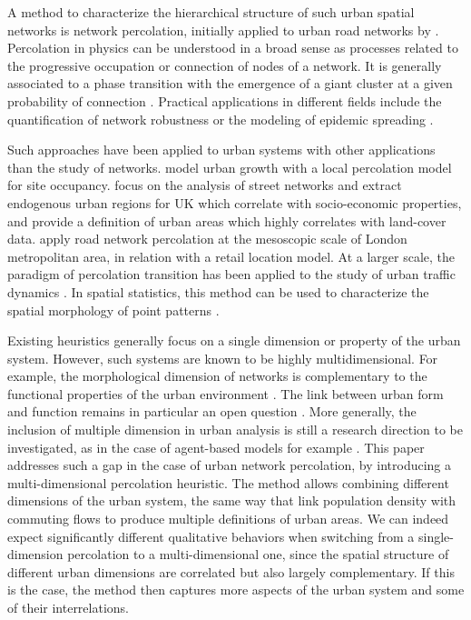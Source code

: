 \documentclass{jimis-en}
\begin{document}
A method to characterize the hierarchical structure of such urban spatial networks is network percolation, initially applied to urban road networks by \cite{arcaute2016cities}. Percolation in physics can be understood in a broad sense as processes related to the progressive occupation or connection of nodes of a network. It is generally associated to a phase transition with the emergence of a giant cluster at a given probability of connection \citep{stauffer2014introduction}. Practical applications in different fields include the quantification of network robustness \citep{callaway2000network} or the modeling of epidemic spreading \citep{newman1999scaling}.

Such approaches have been applied to urban systems with other applications than the study of networks. \cite{makse1998modeling} model urban growth with a local percolation model for site occupancy. \cite{arcaute2016cities} focus on the analysis of street networks and extract endogenous urban regions for UK which correlate with socio-economic properties, and provide a definition of urban areas which highly correlates with land-cover data. \cite{piovani2017urban} apply road network percolation at the mesoscopic scale of London metropolitan area, in relation with a retail location model. At a larger scale, the paradigm of percolation transition has been applied to the study of urban traffic dynamics \citep{Li669,Zeng23}. In spatial statistics, this method can be used to characterize the spatial morphology of point patterns \citep{huynh2018characterisation}.


Existing heuristics generally focus on a single dimension or property of the urban system. However, such systems are known to be highly multidimensional. For example, the morphological dimension of networks is complementary to the functional properties of the urban environment \citep{burger2012form}. The link between urban form and function remains in particular an open question \citep{batty1994fractal}. More generally, the inclusion of multiple dimension in urban analysis is still a research direction to be investigated, as in the case of agent-based models for example \citep{perez2016agent}. This paper addresses such a gap in the case of urban network percolation, by introducing a multi-dimensional percolation heuristic. The method allows combining different dimensions of the urban system, the same way that \cite{cottineau2018defining} link population density with commuting flows to produce multiple definitions of urban areas. We can indeed expect significantly different qualitative behaviors when switching from a single-dimension percolation to a multi-dimensional one, since the spatial structure of different urban dimensions are correlated but also largely complementary. If this is the case, the method then captures more aspects of the urban system and some of their interrelations.
\end{document}
